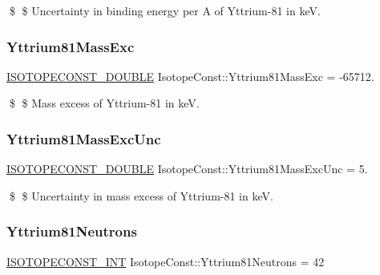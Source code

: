 \$ \$ Uncertainty in binding energy per A of Yttrium-\/81 in keV. \mbox{\label{group___isotope_const-_yttrium-_y81_ga1ddf6ce0c55eba3ff4eb078a4b41f2e5}} 
\subsubsection{\texorpdfstring{Yttrium81\+Mass\+Exc}{Yttrium81MassExc}}
{\footnotesize\ttfamily \mbox{\hyperlink{group___isotope_const-_macros_ga8f45a7272ce02c0b4c65c44636ed719a}{I\+S\+O\+T\+O\+P\+E\+C\+O\+N\+S\+T\+\_\+\+D\+O\+U\+B\+LE}} Isotope\+Const\+::\+Yttrium81\+Mass\+Exc = -\/65712.}

\$ \$ Mass excess of Yttrium-\/81 in keV. \mbox{\label{group___isotope_const-_yttrium-_y81_gaa15705491ab96c79f2359a273704cda5}} 
\subsubsection{\texorpdfstring{Yttrium81\+Mass\+Exc\+Unc}{Yttrium81MassExcUnc}}
{\footnotesize\ttfamily \mbox{\hyperlink{group___isotope_const-_macros_ga8f45a7272ce02c0b4c65c44636ed719a}{I\+S\+O\+T\+O\+P\+E\+C\+O\+N\+S\+T\+\_\+\+D\+O\+U\+B\+LE}} Isotope\+Const\+::\+Yttrium81\+Mass\+Exc\+Unc = 5.}

\$ \$ Uncertainty in mass excess of Yttrium-\/81 in keV. \mbox{\label{group___isotope_const-_yttrium-_y81_ga60ad73a045fb95474f4a5dfc1db16462}} 
\subsubsection{\texorpdfstring{Yttrium81\+Neutrons}{Yttrium81Neutrons}}
{\footnotesize\ttfamily \mbox{\hyperlink{group___isotope_const-_macros_ga5f18360b3e99483a35c32d789e62621c}{I\+S\+O\+T\+O\+P\+E\+C\+O\+N\+S\+T\+\_\+\+I\+NT}} Isotope\+Const\+::\+Yttrium81\+Neutrons = 42}

